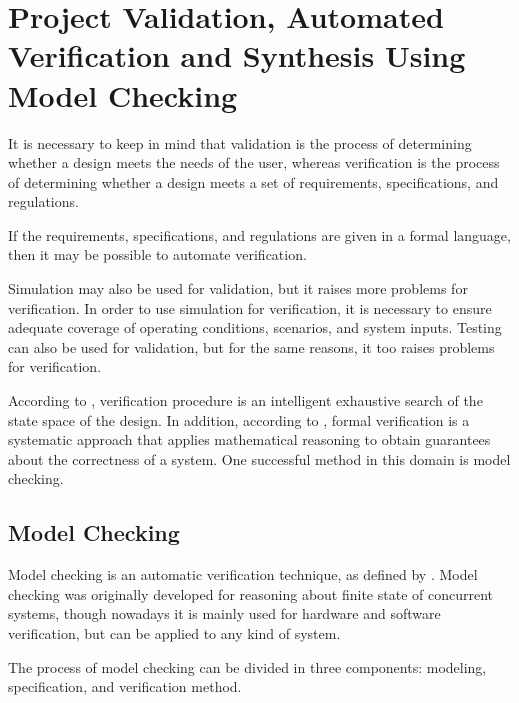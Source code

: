 \section{Project Validation, Automated Verification and Synthesis Using Model Checking}
\label{sec:AutomatedVerification}

It is necessary to keep in mind that validation is the process of determining whether a design meets the needs of the user, whereas verification is the process of determining whether a design meets a set of requirements, specifications, and regulations.  

If the requirements, specifications, and regulations are given in a formal language, then it may be possible to automate verification.  

Simulation may also be used for validation, but it raises more problems for verification. In order to use simulation for verification, it is necessary to ensure adequate coverage of operating conditions, scenarios, and system inputs. Testing can also be used for validation, but for the same reasons, it too raises problems for verification.
 
According to \cite{Clarke2008}, verification procedure is an intelligent exhaustive search of the state space of the design. In addition, according to \cite{Forejt2011}, formal verification is a systematic approach that applies mathematical reasoning to obtain guarantees about the correctness of a system. One successful method in this domain is model checking.

\subsection{Model Checking}
  
Model checking is an automatic verification technique, as defined by \cite{Clarke2008}. Model checking was originally developed for reasoning about finite state of concurrent systems, though nowadays it is mainly used for hardware and software verification, but can be applied to any kind of system. 

The process of model checking can be divided in three components: modeling, specification, and verification method. 

